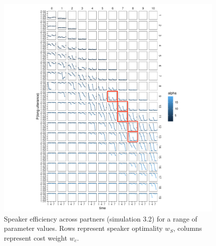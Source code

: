 \documentclass[11pt, floatsintext]{apa6}
\begin{document}
 \begin{figure}
\centering
    \includegraphics[scale=.8]{reduction_grid_search.pdf}
  \caption{Speaker efficiency across partners (simulation 3.2) for a range of parameter values. Rows represent speaker optimality $w_S$, columns represent cost weight $w_c$.}
  \label{fig:partnerspecificity_grid}
\end{figure}
\end{document}
